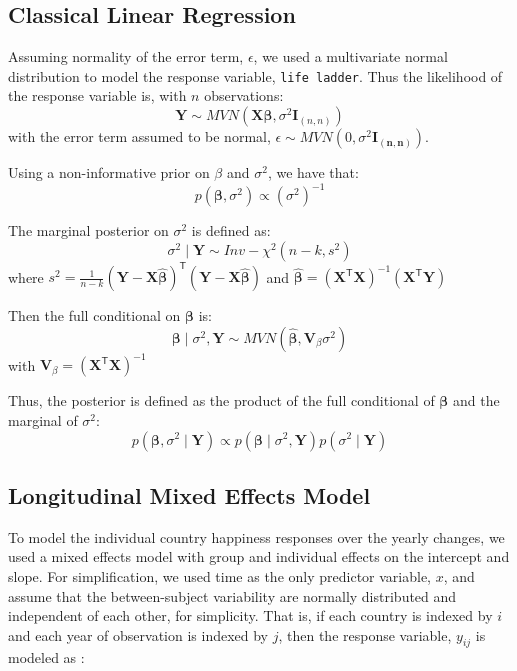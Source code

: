 \documentclass{article}
\begin{document}
\subsection{Classical Linear Regression}
Assuming normality of the error term, $\epsilon$, we used a multivariate normal distribution to model the response variable, \texttt{life ladder}. Thus the likelihood of the response variable is, with $n$ observations:
\begin{equation*} 
\mathbf{Y}\sim MVN(\boldsymbol{X\beta}, \sigma^2\mathbf{I}_{(n,n)})
\end{equation*}
with the error term assumed to be normal, $\epsilon \sim MVN(0, \sigma^2\mathbf{I_{(n,n)}})$.

Using a non-informative prior on $\beta$ and $\sigma^2$, we have that:
\begin{equation*}
p(\boldsymbol{\beta}, \sigma^2) \propto \left(\sigma^2\right)^{-1}
\end{equation*}

The marginal posterior on $\sigma^2$ is defined as:
\begin{equation*}
\sigma^2 \mid \mathbf{Y} \sim Inv-\chi^2(n-k, s^2)
\end{equation*}
where $s^2 = \frac{1}{n-k}(\mathbf{Y} - \mathbf{X}\hat{\boldsymbol{\beta}})^{\mathsf{T}}(\mathbf{Y} - \mathbf{X}\hat{\boldsymbol{\beta}})$ and $\hat{\boldsymbol{\beta}} = (\mathbf{X}^{\mathsf{T}}\mathbf{X})^{-1}(\mathbf{X}^{\mathsf{T}}\mathbf{Y})$

Then the full conditional on $\boldsymbol{\beta}$ is:
\begin{equation*}
\boldsymbol{\beta} \mid \sigma^2, \mathbf{Y} \sim MVN(\hat{\boldsymbol{\beta}}, \mathbf{V}_{\beta}\sigma^2)
\end{equation*}
with $\mathbf{V}_{\beta} = (\mathbf{X}^{\mathsf{T}}\mathbf{X})^{-1}$

Thus, the posterior is defined as the product of the full conditional of $\boldsymbol{\beta}$ and the marginal of $\sigma^2$:
\begin{equation*}
p(\boldsymbol{\beta}, \sigma^2 \mid \mathbf{Y}) \propto p(\boldsymbol{\beta} \mid \sigma^2, \mathbf{Y}) p(\sigma^2 \mid \mathbf{Y})
\end{equation*}

\subsection{Longitudinal Mixed Effects Model} \label{sec:adx_long_deriv}
To model the individual country happiness responses over the yearly changes, we used a mixed effects model with group and individual effects on the intercept and slope. For simplification, we used time as the only predictor variable, $x$, and assume that the between-subject variability are normally distributed and independent of each other, for simplicity. That is, if each country is indexed by $i$ and each year of observation is indexed by $j$, then the response variable, $y_{ij}$ is modeled as \cite{rolfe_2010}:
\end{document}
